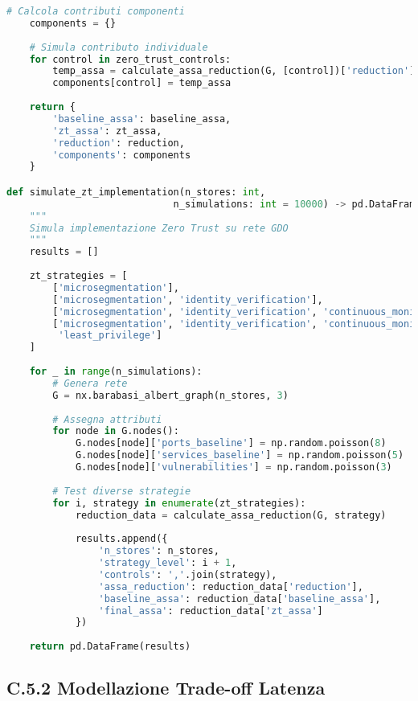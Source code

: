 \begin{lstlisting}[language=Python, caption=Calcolo Riduzione ASSA con Zero Trust]
    # Calcola contributi componenti
    components = {}
    
    # Simula contributo individuale
    for control in zero_trust_controls:
        temp_assa = calculate_assa_reduction(G, [control])['reduction']
        components[control] = temp_assa
    
    return {
        'baseline_assa': baseline_assa,
        'zt_assa': zt_assa,
        'reduction': reduction,
        'components': components
    }

def simulate_zt_implementation(n_stores: int, 
                             n_simulations: int = 10000) -> pd.DataFrame:
    """
    Simula implementazione Zero Trust su rete GDO
    """
    results = []
    
    zt_strategies = [
        ['microsegmentation'],
        ['microsegmentation', 'identity_verification'],
        ['microsegmentation', 'identity_verification', 'continuous_monitoring'],
        ['microsegmentation', 'identity_verification', 'continuous_monitoring', 
         'least_privilege']
    ]
    
    for _ in range(n_simulations):
        # Genera rete
        G = nx.barabasi_albert_graph(n_stores, 3)
        
        # Assegna attributi
        for node in G.nodes():
            G.nodes[node]['ports_baseline'] = np.random.poisson(8)
            G.nodes[node]['services_baseline'] = np.random.poisson(5)
            G.nodes[node]['vulnerabilities'] = np.random.poisson(3)
        
        # Test diverse strategie
        for i, strategy in enumerate(zt_strategies):
            reduction_data = calculate_assa_reduction(G, strategy)
            
            results.append({
                'n_stores': n_stores,
                'strategy_level': i + 1,
                'controls': ','.join(strategy),
                'assa_reduction': reduction_data['reduction'],
                'baseline_assa': reduction_data['baseline_assa'],
                'final_assa': reduction_data['zt_assa']
            })
    
    return pd.DataFrame(results)
\end{lstlisting}

\subsection{C.5.2 Modellazione Trade-off Latenza}

